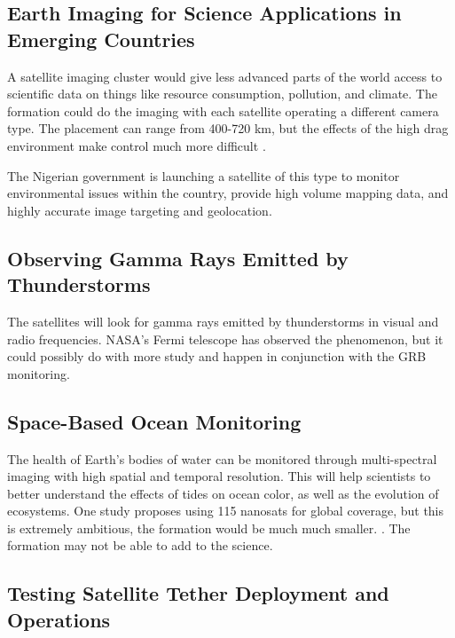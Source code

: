 \subsection{Earth Imaging for Science Applications in Emerging Countries}

A satellite imaging cluster would give less advanced parts of the
world access to scientific data on things like resource consumption,
pollution, and climate. The formation could do the imaging with each
satellite operating a different camera type. The placement can range
from 400-720 km, but the effects of the high drag environment make
control much more difficult\cite{Ref:Harrison} \cite{Ref:Atir} \cite{Ref:Herscovitz}\cite{Ref:Kalman}\cite{Ref:Kim}.

The Nigerian government is launching a satellite of this type to monitor
environmental issues within the country, provide high volume mapping
data, and highly accurate image targeting and geolocation\cite{Ref:Curiel}. 

\subsection{Observing Gamma Rays Emitted by Thunderstorms}

The satellites will look for gamma rays emitted by thunderstorms in
visual and radio frequencies. NASA's Fermi telescope has observed
the phenomenon, but it could possibly do with more study and happen
in conjunction with the GRB monitoring.\cite{Ref:Fermi} \cite{Ref:Kitts}

\subsection{Space-Based Ocean Monitoring}

The health of Earth's bodies of water can be monitored through multi-spectral imaging with high spatial and temporal resolution. This will help scientists to better understand the effects of tides on ocean color, as well as the evolution of ecosystems. One study proposes using 115 nanosats for global coverage, but this is extremely ambitious, the formation would be much much smaller. \cite{Ref:Lowe}. The formation may not be able to add to the science.

\subsection{Testing Satellite Tether Deployment and Operations}

